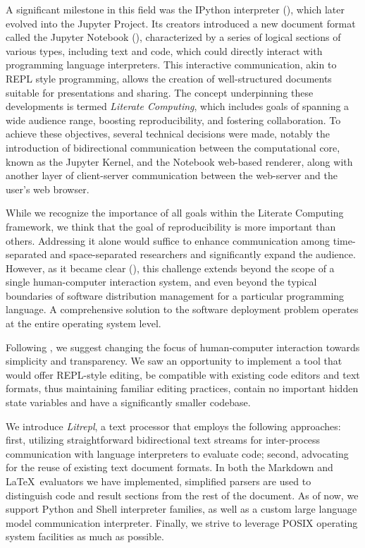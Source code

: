 \documentclass[letterpaper,12pt,twocolumn]{article}
\begin{document}
A significant milestone in this field was the IPython interpreter
(\textcite{Perez2007IPython}), which later evolved into the Jupyter Project. Its
creators introduced a new document format called the Jupyter Notebook
(\textcite{Kluyver2016jupnb}), characterized by a series of logical sections of
various types, including text and code, which could directly interact with
programming language interpreters. This interactive communication, akin to REPL
style programming, allows the creation of well-structured documents suitable for
presentations and sharing. The concept underpinning these developments is termed
\textit{Literate Computing}\cite{Perez2015blog}, which includes goals of
spanning a wide audience range, boosting reproducibility, and fostering
collaboration. To achieve these objectives, several technical decisions were
made, notably the introduction of bidirectional communication between the
computational core, known as the Jupyter Kernel, and the Notebook web-based
renderer, along with another layer of client-server communication between the
web-server and the user’s web browser.

While we recognize the importance of all goals within the Literate Computing
framework, we think that the goal of reproducibility is more important than
others. Addressing it alone would suffice to enhance communication among
time-separated and space-separated researchers and significantly expand the
audience. However, as it became clear (\textcite{Dolstra2010}), this challenge
extends beyond the scope of a single human-computer interaction system, and even
beyond the typical boundaries of software distribution management for a
particular programming language. A comprehensive solution to the software
deployment problem operates at the entire operating system level.

Following \textcite{Vallet2022}, we suggest changing the focus of human-computer
interaction towards simplicity and transparency. We saw an opportunity to
implement a tool that would offer REPL-style editing, be compatible with
existing code editors and text formats, thus maintaining familiar editing
practices, contain no important hidden state variables and have a significantly
smaller codebase.

We introduce \textit{Litrepl}, a text processor that employs the following
approaches: first, utilizing straightforward bidirectional text streams for
inter-process communication with language interpreters to evaluate code; second,
advocating for the reuse of existing text document formats. In both the Markdown
and \LaTeX\ evaluators we have implemented, simplified parsers are used to
distinguish code and result sections from the rest of the document. As of now,
we support Python and Shell interpreter families, as well as a custom large
language model communication interpreter. Finally, we strive to leverage
POSIX\cite{POSIX2024} operating system facilities as much as possible.
\end{document}
